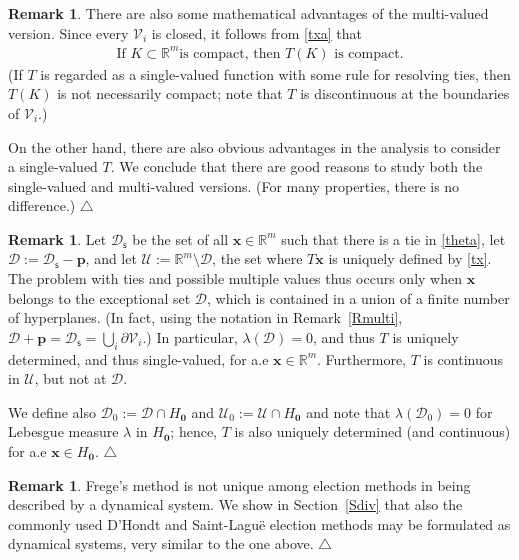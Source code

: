 \documentclass[11pt,reqno,tbtags,a4paper]{amsart}
\numberwithin{equation}{section}
\theoremstyle{plain}%
\theoremstyle{definition}
\newcommand\xqed[1]{%
    \leavevmode\unskip\penalty9999 \hbox{}\nobreak\hfill
    \quad\hbox{#1}}
\newtheorem{remarkqqq}[theorem]{Remark}
\newenvironment{remark}{\begin{remarkqqq}}
  {\xqed{$\triangle$}\end{remarkqqq}}
\theoremstyle{remark}
\newcommand{\refR}[1]{Remark~\ref{#1}}
\newcommand{\refS}[1]{Section~\ref{#1}}
\newcommand\punkt{\xperiod}    %
\newcommand{\aex}{a.e\punkt}
\newcommand\bbR{\mathbb R}
\newcounter{cc}
\newcommand\gl{\lambda}
\newcommand\cD{\mathcal D}
\newcommand\cU{{\mathcal U}}
\newcommand\cV{\mathcal V}
\newcommand\dH{D'Hondt}
\newcommand\SL{Saint-Lagu\"e}
\newcommand\Ho{H_{\0}}
\newcommand\vp{\mathbf{p}}
\newcommand\vx{\mathbf{x}}
\newcommand\sfs{{\mathsf{s}}}
\newcommand\0{{\boldsymbol 0}}
\newcommand\1{{\boldsymbol 1}}
\begin{document}
\begin{remark}
There are also some mathematical advantages of the multi-valued version. 
Since every $\cV_i$ is closed, it follows from \eqref{txa} that
\begin{align}\label{compact}
\text{If $K\subset\bbR^m$
is compact, then $T(K)$ is compact.}
\end{align}
(If $T$ is regarded as a single-valued function with some rule for resolving
ties, then $T(K)$ is not necessarily compact; note that $T$ is discontinuous
at the boundaries of $\cV_i$.)

On the other hand, there are also obvious advantages in the analysis to
consider a single-valued $T$. We conclude that there are good reasons to
study both the single-valued and multi-valued versions.
(For many properties, there is no difference.)
\end{remark}

\begin{remark}\label{RD}
Let $\cD_\sfs$ be the set of all $\vx\in\bbR^m$ such that
there is a tie in \eqref{theta}, 
let $\cD:=\cD_\sfs-\vp$,
and let $\cU:=\bbR^m\setminus\cD$,
the set where $T\vx$ is uniquely defined by  \eqref{tx}.
The problem with ties and possible multiple values thus occurs only
when $\vx$ belongs to the exceptional set $\cD$,
which is contained in a union of a finite number of hyperplanes. 
(In fact, using the notation in \refR{Rmulti}, 
$\cD+\vp=\cD_\sfs=\bigcup_i\partial \cV_i$.)
In particular, $\gl(\cD)=0$, and thus
$T$ is uniquely determined, 
and thus single-valued,
for \aex{} $\vx\in\bbR^m$.
Furthermore, $T$ is continuous in $\cU$, but not at $\cD$.

We define also $\cD_0:=\cD\cap\Ho$ and $\cU_0:=\cU\cap\Ho$ and note that
$\gl(\cD_0)=0$ for Lebesgue measure $\gl$ in $\Ho$;
hence, $T$ is also uniquely determined (and continuous) for \aex{} $\vx\in\Ho$.
\end{remark}


\begin{remark}\label{Rothers}
Frege's  method is not unique among election methods
in being described by a dynamical system.
We show in \refS{Sdiv} that also the commonly used 
\dH{} and \SL{} election methods may be formulated as dynamical
systems, very similar to the one above.
\end{remark}
\end{document}
